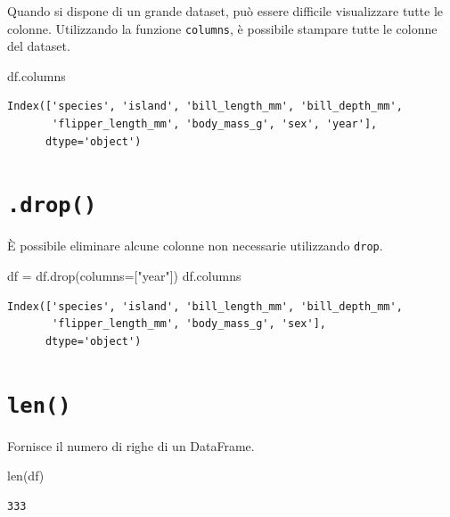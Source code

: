 \documentclass[
  letterpaper,
  krantz2]{{[}./krantz{]}}
\newenvironment{Shaded}{\begin{snugshade}}{\end{snugshade}}
\newcommand{\BuiltInTok}[1]{\textcolor[rgb]{0.00,0.23,0.31}{#1}}
\newcommand{\NormalTok}[1]{\textcolor[rgb]{0.00,0.23,0.31}{#1}}
\newcommand{\OperatorTok}[1]{\textcolor[rgb]{0.37,0.37,0.37}{#1}}
\newcommand{\StringTok}[1]{\textcolor[rgb]{0.13,0.47,0.30}{#1}}
\begin{document}
Quando si dispone di un grande dataset, può essere difficile
visualizzare tutte le colonne. Utilizzando la funzione \texttt{columns},
è possibile stampare tutte le colonne del dataset.

\begin{Shaded}
\begin{Highlighting}[]
\NormalTok{df.columns}
\end{Highlighting}
\end{Shaded}

\begin{verbatim}
Index(['species', 'island', 'bill_length_mm', 'bill_depth_mm',
       'flipper_length_mm', 'body_mass_g', 'sex', 'year'],
      dtype='object')
\end{verbatim}

\section{\texorpdfstring{\texttt{.drop()}}{.drop()}}\label{drop}

È possibile eliminare alcune colonne non necessarie utilizzando
\texttt{drop}.

\begin{Shaded}
\begin{Highlighting}[]
\NormalTok{df }\OperatorTok{=}\NormalTok{ df.drop(columns}\OperatorTok{=}\NormalTok{[}\StringTok{"year"}\NormalTok{])}
\NormalTok{df.columns}
\end{Highlighting}
\end{Shaded}

\begin{verbatim}
Index(['species', 'island', 'bill_length_mm', 'bill_depth_mm',
       'flipper_length_mm', 'body_mass_g', 'sex'],
      dtype='object')
\end{verbatim}

\section{\texorpdfstring{\texttt{len()}}{len()}}\label{len}

Fornisce il numero di righe di un DataFrame.

\begin{Shaded}
\begin{Highlighting}[]
\BuiltInTok{len}\NormalTok{(df)}
\end{Highlighting}
\end{Shaded}

\begin{verbatim}
333
\end{verbatim}
\end{document}
